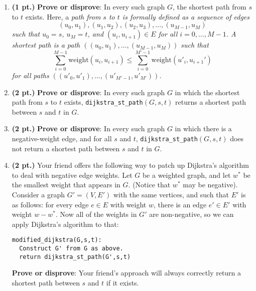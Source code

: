 \documentclass{article}
\begin{document}
\begin{enumerate}
\begin{enumerate}

      \item \textbf{(1 pt.)} \textbf{Prove or disprove}: In every such graph $G$,
        the shortest path from $s$ to $t$ exists.  Here, a \em path \em from $s$
        to $t$ is formally defined as a sequence of edges
        \[ (u_0,u_1), (u_1, u_2), (u_2,u_3), \ldots, (u_{M-1}, u_M)\]
        such that $u_0 = s$, $u_M = t$, and $(u_i, u_{i+1}) \in E$ for all
        $i=0,\ldots,M-1$.  A \em shortest path \em is a path
        $((u_0,u_1),\ldots,(u_{M-1},u_M))$ such that
        \[ \sum_{i=0}^{M-1} \mathrm{weight}(u_i,u_{i+1}) \leq  \sum_{i=0}^{M'-1} \mathrm{weight}(u'_i, u_{i+1}')\]
        for all paths $((u'_0, u'_1),\ldots, (u'_{M'-1}, u'_{M'}))$.

      \item \textbf{(2 pt.)} \textbf{Prove or disprove}: In every such graph $G$
        in which the shortest path from $s$ to $t$ exists,
        \texttt{dijkstra\_st\_path}$(G, s,t)$ returns a shortest path between $s$
        and $t$ in $G$.

      \item \textbf{(2 pt.)} \textbf{Prove or disprove}: In every such graph $G$
        in which there is a negative-weight edge, and for all $s$ and $t$,
        \texttt{dijkstra\_st\_path}$(G, s,t)$ does not return a shortest path
        between $s$ and $t$ in $G$.
  
      \newpage

      \item \textbf{(2 pt.)} Your friend offers the following way to patch up
        Dijkstra's algorithm to deal with negative edge weights. Let $G$ be a
        weighted graph, and let $w^*$ be the smallest weight that appears in $G$.
        (Notice that $w^*$ may be negative). Consider a graph $G' = (V,E')$ with
        the same vertices, and such that $E'$ is as follows: for every edge
        $e \in E$ with weight $w$, there is an edge $e' \in E'$ with weight
        $w - w^*$. Now all of the weights in $G'$ are non-negative, so we can
        apply Dijkstra's algorithm to that:

        \begin{verbatim}
modified_dijkstra(G,s,t):
  Construct G' from G as above.
  return dijkstra_st_path(G',s,t)
        \end{verbatim}
       
        \textbf{Prove or disprove}: Your friend's approach will always correctly
        return a shortest path between $s$ and $t$ if it exists.
    \end{enumerate}
  \newpage
\end{enumerate}
\end{document}
